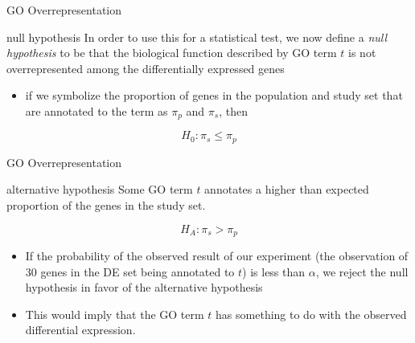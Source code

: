 \documentclass{beamer}
\begin{document}
\begin{frame}{GO Overrepresentation}
 \begin{mybluebox}{null hypothesis}
 In order to use this for a statistical test,
 we now define a \textit{null hypothesis} to be
that the biological function described by GO term $t$ is not
overrepresented among the differentially expressed genes
\end{mybluebox}


\begin{itemize}
 \item if we
symbolize the proportion of genes in the population and study set that
are annotated to the term as $\pi_p$ and $\pi_s$, then
\end{itemize}
\begin{equation}
H_0:\pi_{s}\leq\pi_p 
\end{equation}

\end{frame}


\begin{frame}{GO Overrepresentation}
\begin{mybluebox}{alternative hypothesis}
Some GO term $t$ annotates a higher than expected proportion of the genes
in the study set.
\end{mybluebox}

\begin{equation}
H_A:\pi_{s}>\pi_p 
\end{equation}

\begin{itemize}
\item If the probability of the observed result of our experiment
(the observation of 30 genes in the DE set being annotated to $t$) is
less than $\alpha$, we reject the null hypothesis in favor of the
alternative hypothesis
\item This  would imply that the GO term $t$ has
something to do with the observed differential expression.
\end{itemize}


\end{frame}
\end{document}
